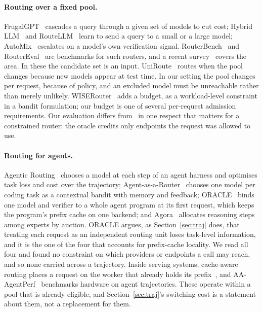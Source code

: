 \documentclass[11pt]{article}
\begin{document}
\paragraph{Routing over a fixed pool.} FrugalGPT~\cite{frugalgpt} cascades a query through a
given set of models to cut cost; Hybrid LLM~\cite{hybridllm} and RouteLLM~\cite{routellm} learn
to send a query to a small or a large model; AutoMix~\cite{automix} escalates on a model's own
verification signal. RouterBench~\cite{routerbench} and RouterEval~\cite{routereval} are
benchmarks for such routers, and a recent survey~\cite{routingsurvey} covers the area. In these
the candidate set is an input. UniRoute~\cite{uniroute} routes when the pool changes because new
models appear at test time. In our setting the pool changes per request, because of policy, and
an excluded model must be unreachable rather than merely unlikely. WISERouter~\cite{wiserouter}
adds a budget, as a workload-level constraint in a bandit formulation; our budget is one of
several per-request admission requirements. Our evaluation differs from~\cite{routerbench,routereval}
in one respect that matters for a constrained router: the oracle credits only endpoints the
request was allowed to use.

\paragraph{Routing for agents.} Agentic Routing~\cite{agenticrouting} chooses a model at each
step of an agent harness and optimises task loss and cost over the trajectory;
Agent-as-a-Router~\cite{agentasrouter} chooses one model per coding task as a contextual bandit
with memory and feedback; ORACLE~\cite{oracle} binds one model and verifier to a whole agent
program at its first request, which keeps the program's prefix cache on one backend; and
Agora~\cite{agora} allocates reasoning steps among experts by auction. ORACLE argues, as
Section~\ref{sec:traj} does, that treating each request as an independent routing unit loses
task-level information, and it is the one of the four that accounts for prefix-cache locality.
We read all four and found no constraint on which providers or endpoints a call may
reach, and so none carried across a trajectory. Inside serving
systems, cache-aware routing places a request on the worker that already holds its
prefix~\cite{dynamo,pagedattention}, and AA-AgentPerf~\cite{aaagentperf} benchmarks hardware on
agent trajectories. These operate within a pool that is already eligible, and
Section~\ref{sec:traj}'s switching cost is a statement about them, not a replacement for them.
\end{document}
